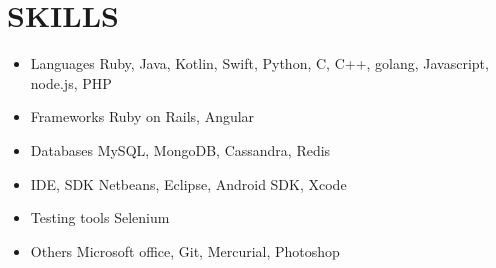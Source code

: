 \documentclass[11pt,a4paper]{article}
\begin{document}
\section*{SKILLS}
\TabPositions{3cm}
\begin{itemize}[noitemsep]
\item Languages \tab Ruby, Java, Kotlin, Swift, Python, C, C++, golang, Javascript, node.js, PHP
\item Frameworks \tab Ruby on Rails, Angular
\item Databases \tab MySQL, MongoDB, Cassandra, Redis
\item IDE, SDK \tab Netbeans, Eclipse, Android SDK, Xcode
\item Testing tools \tab Selenium
\item Others \tab Microsoft office, Git, Mercurial, Photoshop
\end{itemize}
\end{document}
